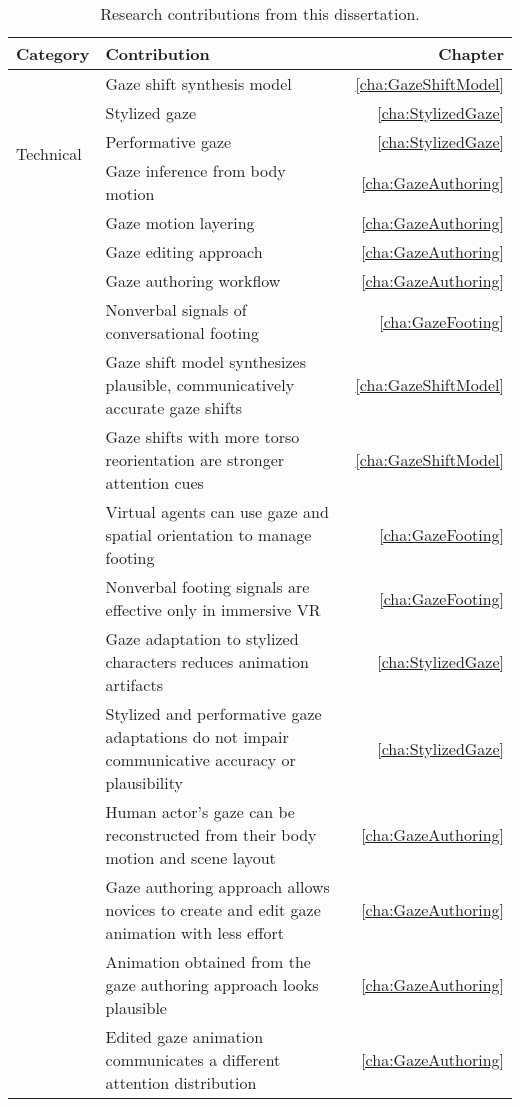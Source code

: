 \begin{table}
\small
\centering
\def\arraystretch{1.5}
\begin{tabularx}{\textwidth}{lp{10.8cm}r}
\hline
\textbf{Category} & \textbf{Contribution} & \textbf{Chapter} \\
\hline
\multirow{5}{*}{Technical} & Gaze shift synthesis model & \ref{cha:GazeShiftModel} \\
& Stylized gaze & \ref{cha:StylizedGaze} \\
& Performative gaze & \ref{cha:StylizedGaze} \\
& Gaze inference from body motion & \ref{cha:GazeAuthoring} \\
& Gaze motion layering & \ref{cha:GazeAuthoring} \\
\hdashline
\multirow{3}{*}{Design} & Gaze editing approach & \ref{cha:GazeAuthoring} \\
& Gaze authoring workflow & \ref{cha:GazeAuthoring} \\
& Nonverbal signals of conversational footing & \ref{cha:GazeFooting} \\
\hdashline
\multirow{10}{*}{Design} & Gaze shift model synthesizes plausible, communicatively accurate gaze shifts & \ref{cha:GazeShiftModel} \\
& Gaze shifts with more torso reorientation are stronger attention cues & \ref{cha:GazeShiftModel} \\
& Virtual agents can use gaze and spatial orientation to manage footing & \ref{cha:GazeFooting} \\
& Nonverbal footing signals are effective only in immersive VR & \ref{cha:GazeFooting} \\
& Gaze adaptation to stylized characters reduces animation artifacts & \ref{cha:StylizedGaze} \\
& Stylized and performative gaze adaptations do not impair communicative accuracy or plausibility & \ref{cha:StylizedGaze} \\
& Human actor's gaze can be reconstructed from their body motion and scene layout & \ref{cha:GazeAuthoring} \\
& Gaze authoring approach allows novices to create and edit gaze animation with less effort & \ref{cha:GazeAuthoring} \\
& Animation obtained from the gaze authoring approach looks plausible & \ref{cha:GazeAuthoring} \\
& Edited gaze animation communicates a different attention distribution & \ref{cha:GazeAuthoring} \\
\hline
\end{tabularx}
\caption{Research contributions from this dissertation.}
\label{tab:Contributions}
\end{table}

